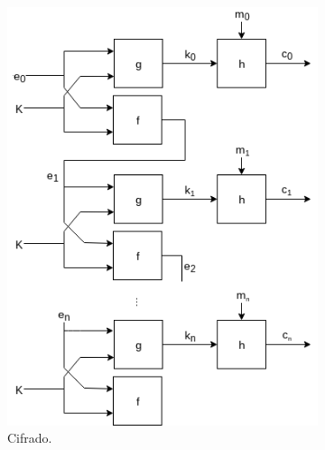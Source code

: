 \begin{figure}[H]
  \centering
  \begin{subfigure}{0.45\textwidth}
    \begin{center}
      \includegraphics[width=0.9\linewidth]{diagramas/sincrono_cifrado.png}
      \caption{Cifrado.}
    \end{center}
  \end{subfigure}
  \begin{subfigure}{0.45\textwidth}
    \begin{center}

\end{center}
\end{subfigure}
\end{figure}
